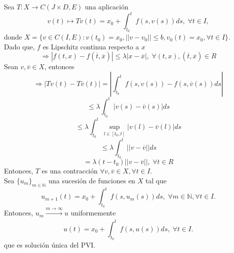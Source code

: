 \begin{dem}
  Sea $T: X \to C(J \times D, E)$ una aplicación
  \[
    v(t) \mapsto T v(t) = x_{0} + \int_{t_{0}}^{t} f(s, v(s)) ds, \; \forall t \in I,
  \]
  donde $X = \{ v \in C(I, E) : v(t_{0}) = x_{0}, ||v -v_{0}||\leq b, v_{0}(t) = x_{0}, \forall t \in I \}$. \\

  Dado que, $f$ es Lipschitz continua respecto a $x$
  \[ 
    \Rightarrow | f(t,x) - f(\overline{t},\overline{x}) | \leq \lambda | x - \overline{x} |, \; \forall (t,x), (\overline{t}, \overline{x}) \in R
  \] 
  Sean $v, \overline{v} \in X$, entonces
  \[ 
    \Rightarrow | Tv(t) - T\overline{v}(t) | = | \int_{t_{0}}^{t} f(s, v(s)) - f(s, \overline{v}(s)) ds |
  \] 
  \[ 
    \leq \lambda \int_{t_{0}}^{t} | v(s) - \overline{v}(s) | ds
  \] 
  \[ 
    \leq \lambda \int_{t_{0}}^{t} \sup_{l \in [t_{0}, t]}| v(l) - \overline{v}(l) | ds
  \] 
  \[ 
    \leq \lambda \int_{t_{0}}^{t} || v - \overline{v} || ds
  \] 
  \[ 
    = \lambda (t - t_{0}) || v - \overline{v} ||, \; \forall t \in R
  \] 
  Entonces, $T$ es una contracción $\forall v, \overline{v} \in X, \forall t \in I$. \\

  Sea $\{ u_{m} \}_{ m \in \mathbb{N}}$ una sucesión de funciones en $X$ tal que
  \[
    u_{m+1}(t) = x_{0} + \int_{t_{0}}^{t} f(s, u_{m}(s)) ds, \; \forall m \in \mathbb{N}, \forall t \in I.
  \] 
  Entonces, $u_{m} \xrightarrow[]{ m \rightarrow \infty } u$ uniformemente 
  \[ 
    u(t) = x_{0} + \int_{t_{0}}^{t} f(s, u(s)) ds, \; \forall t \in I. 
  \] 
  que es solución única del PVI.
\end{dem}

